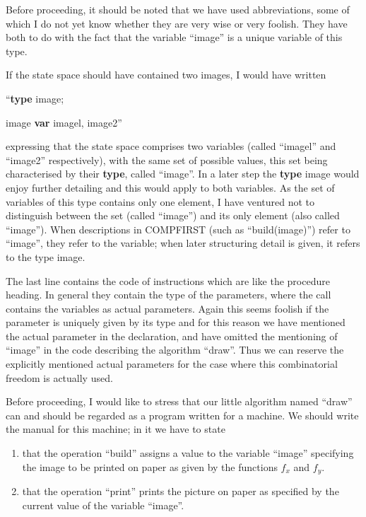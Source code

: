 Before proceeding, it should be noted that we have used abbreviations, some of which I do not yet know whether they are very wise or very foolish. They have both to do with the fact that the variable ``image'' is a unique variable of this type.

If the state space should have contained two images, I would have written

\noindent
``\textbf{type} image;

\noindent
image \textbf{var} imagel, image2''

\noindent
expressing that the state space comprises two variables (called ``imagel'' and ``image2'' respectively), with the same set of possible values, this set being characterised by their \textbf{type}, called ``image''. In a later step the \textbf{type} image would enjoy further detailing and this would apply to both variables. As the set of variables of this type contains only one element, I have ventured not to distinguish between the set (called ``image'') and its only element (also called ``image''). When descriptions in COMPFIRST (such as ``build(image)'') refer to ``image'', they refer to the variable; when later structuring detail is given, it refers to the type image.

The last line contains the code of instructions which are like the procedure heading. In general they contain the type of the parameters, where the call contains the variables as actual parameters. Again this seems foolish if the parameter is uniquely given by its type and for this reason we have mentioned the actual parameter in the declaration, and have omitted the mentioning of ``image'' in the code describing the algorithm ``draw''. Thus we can reserve the explicitly mentioned actual parameters for the case where this combinatorial freedom is actually used.

Before proceeding, I would like to stress that our little algorithm named ``draw'' can and should be regarded as a program written for a machine. We should write the manual for this machine; in it we have to state 
\begin{enumerate}[wide, nosep, label=(\arabic*)]
	\item that the operation ``build'' assigns a value to the variable ``image'' specifying the image to be printed on paper as given by the functions $f_x$ and $f_y$.

	\item that the operation ``print'' prints the picture on paper as specified by the current value of the variable ``image''.
\end{enumerate}

